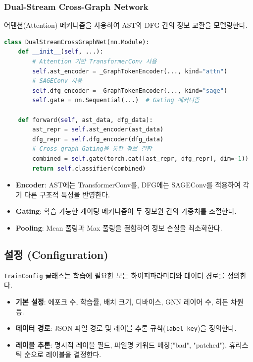 \subsubsection{Dual-Stream Cross-Graph Network}
어텐션(Attention) 메커니즘을 사용하여 AST와 DFG 간의 정보 교환을 모델링한다.



\begin{lstlisting}[language=Python, caption=Dual-Stream 모델 구조]
class DualStreamCrossGraphNet(nn.Module):
    def __init__(self, ...):
        # Attention 기반 TransformerConv 사용
        self.ast_encoder = _GraphTokenEncoder(..., kind="attn")
        # SAGEConv 사용
        self.dfg_encoder = _GraphTokenEncoder(..., kind="sage")
        self.gate = nn.Sequential(...)  # Gating 메커니즘

    def forward(self, ast_data, dfg_data):
        ast_repr = self.ast_encoder(ast_data)
        dfg_repr = self.dfg_encoder(dfg_data)
        # Cross-graph Gating을 통한 정보 결합
        combined = self.gate(torch.cat([ast_repr, dfg_repr], dim=-1))
        return self.classifier(combined)
\end{lstlisting}

\begin{itemize}
    \item \textbf{Encoder}: AST에는 TransformerConv를, DFG에는 SAGEConv를 적용하여 각기 다른 구조적 특성을 반영한다.
    \item \textbf{Gating}: 학습 가능한 게이팅 메커니즘이 두 정보원 간의 가중치를 조절한다.
    \item \textbf{Pooling}: Mean 풀링과 Max 풀링을 결합하여 정보 손실을 최소화한다.
\end{itemize}



\subsection{설정 (Configuration)}

\texttt{TrainConfig} 클래스는 학습에 필요한 모든 하이퍼파라미터와 데이터 경로를 정의한다.

\begin{itemize}
    \item \textbf{기본 설정}: 에포크 수, 학습률, 배치 크기, 디바이스, GNN 레이어 수, 히든 차원 등.
    \item \textbf{데이터 경로}: JSON 파일 경로 및 레이블 추론 규칙(\texttt{label\_key})을 정의한다.
    \item \textbf{레이블 추론}: 명시적 레이블 필드, 파일명 키워드 매칭("bad", "patched"), 휴리스틱 순으로 레이블을 결정한다.
\end{itemize}

